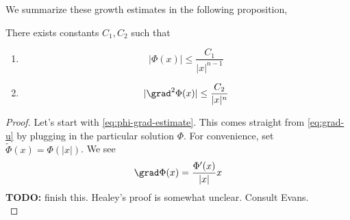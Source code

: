 \documentclass{bkcnotes}
\newcommand{\todo}[1]{{\bf TODO: } #1\\}
\begin{document}
We summarize these growth estimates in the following proposition,
\begin{nprop}
  There exists constants $C_1,C_2$ such that
  \begin{enumerate}
  \item
    \begin{equation}
      \label{eq:phi-grad-estimate}
      |\Phi(x)| \leq \frac{C_1}{|x|^{n-1}}
    \end{equation}
  \item
    \begin{equation}
      \label{eq:phi-snd-grad-estimate}
      |\grad^2 \Phi(x)| \leq \frac{C_2}{|x|^n}
    \end{equation}
  \end{enumerate}
\end{nprop}
\begin{proof}
  Let's start with \eqref{eq:phi-grad-estimate}. This comes straight
  from \eqref{eq:grad-u} by plugging in the particular solution
  $\Phi$. For convenience, set $\tilde{\Phi}(x) = \Phi(|x|)$. We see
  \begin{equation}
    \label{eq:sub-phi-in-grad}
    \grad \Phi(x) = \frac{\Phi'(x)}{|x|}x
  \end{equation}
  \todo{finish this. Healey's proof is somewhat unclear. Consult Evans.}


\end{proof}
\end{document}
